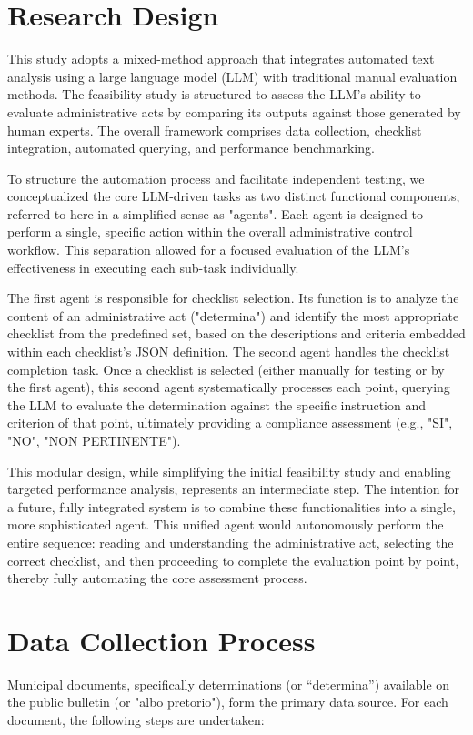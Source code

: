 \documentclass[../main.tex]{subfiles}
\begin{document}
\section{Research Design}
This study adopts a mixed-method approach that integrates automated text analysis using a large language model (LLM) with traditional manual evaluation methods. The feasibility study is structured to assess the LLM's ability to evaluate administrative acts by comparing its outputs against those generated by human experts. The overall framework comprises data collection, checklist integration, automated querying, and performance benchmarking. 

To structure the automation process and facilitate independent testing, we conceptualized the core LLM-driven tasks as two distinct functional components, referred to here in a simplified sense as "agents". Each agent is designed to perform a single, specific action within the overall administrative control workflow. This separation allowed for a focused evaluation of the LLM's effectiveness in executing each sub-task individually.

The first agent is responsible for checklist selection. Its function is to analyze the content of an administrative act ("determina") and identify the most appropriate checklist from the predefined set, based on the descriptions and criteria embedded within each checklist's JSON definition. The second agent handles the checklist completion task. Once a checklist is selected (either manually for testing or by the first agent), this second agent systematically processes each point, querying the LLM to evaluate the determination against the specific instruction and criterion of that point, ultimately providing a compliance assessment (e.g., "SI", "NO", "NON PERTINENTE").

This modular design, while simplifying the initial feasibility study and enabling targeted performance analysis, represents an intermediate step. The intention for a future, fully integrated system is to combine these functionalities into a single, more sophisticated agent. This unified agent would autonomously perform the entire sequence: reading and understanding the administrative act, selecting the correct checklist, and then proceeding to complete the evaluation point by point, thereby fully automating the core assessment process.

\section{Data Collection Process}
Municipal documents, specifically determinations (or “determina”) available on the public bulletin (or "albo pretorio"), form the primary data source. For each document, the following steps are undertaken:
\end{document}
